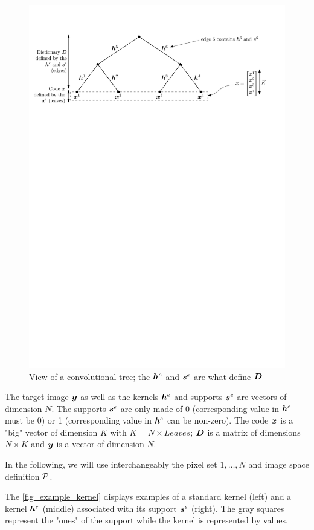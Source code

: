 \begin{figure}[!ht]\centering
\includegraphics[width=\textwidth]{figures/tree.pdf}
\caption{View of a convolutional tree; the $\h^e$ and $\s^e$ are what define $\D$}\label{fig_tree}
\end{figure}

The target image $\y$ as well as the kernels $\h^e$ and supports $\s^e$ are vectors of dimension $N$. The supports $\s^e$ are only made of 0 (corresponding value in $\h^e$ must be 0) or 1 (corresponding value in $\h^e$ can be non-zero). The code $\x$ is a "big" vector of dimension $K$ with $K = N \times Leaves$; $\D$ is a matrix of dimensions $N \times K$ and $\y$ is a vector of dimension $N$.

In the following, we will use interchangeably the pixel set $1,\dots,N$ and image space definition $\P$.

The \cref{fig_example_kernel} displays examples of a standard kernel (left) and a kernel $\h^e$ (middle) associated with its support $\s^e$ (right). The gray squares represent the "ones" of the support while the kernel is represented by values.

